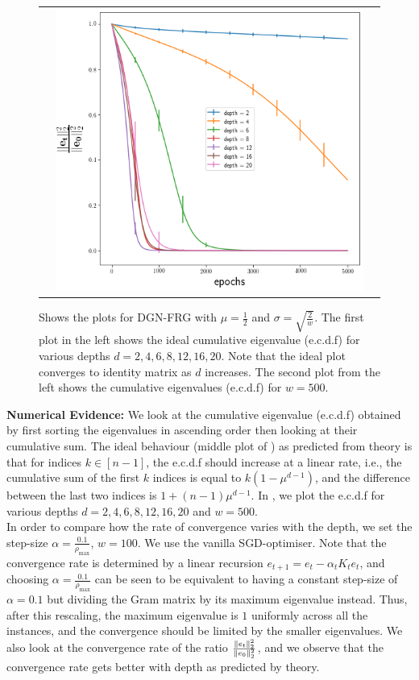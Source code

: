 \begin{figure}
{\begin{tabular}{ccc}
&
\includegraphics[scale=0.4]{figs/dgn-fra-conv-w500.png}
\end{tabular}
}
\caption{Shows the plots for DGN-FRG with $\mu=\frac{1}{2}$ and $\sigma=\sqrt{\frac{2}{w}}$. The first plot in the left shows the ideal cumulative eigenvalue (e.c.d.f) for various depths $d=2,4,6,8,12,16,20$. Note that the ideal plot converges to identity matrix as $d$ increases. The second plot from the left shows the cumulative eigenvalues (e.c.d.f) for $w=500$. }
\label{fig:dgn-frg-gram-ecdf}
\end{figure}
\textbf{Numerical Evidence:} We look at the cumulative eigenvalue (e.c.d.f) obtained by first sorting the eigenvalues in ascending order then looking at their cumulative sum. The ideal behaviour (middle plot of ) as predicted from theory is that for indices $k\in[n-1]$, the e.c.d.f should increase at a linear rate, i.e., the cumulative sum of the first $k$ indices is equal to $k(1-\mu^{d-1})$, and the difference between the last two indices is $1+(n-1)\mu^{d-1}$. In , we plot the e.c.d.f for various depths $d=2,4,6,8,12,16,20$ and $w=500$. \hfill\\
In order to compare how the rate of convergence varies with the depth, we set the step-size $\alpha=\frac{0.1}{\rho_{\max}}$, $w=100$. We use the vanilla SGD-optimiser. Note that the convergence rate is determined by a linear recursion $e_{t+1}=e_t-\alpha_t K_te_t$, and choosing $\alpha=\frac{0.1}{\rho_{\max}}$ can be seen to be equivalent to having a constant step-size of $\alpha=0.1$ but dividing the Gram matrix by its maximum eigenvalue instead. Thus, after this rescaling, the maximum eigenvalue is $1$ uniformly across all the instances, and the convergence should be limited by the smaller eigenvalues. We also look at the convergence rate of the ratio $\frac{\|e_t\|^2_2}{\|e_0\|^2_2}$, and we observe that the convergence rate gets better with depth as predicted by theory.
